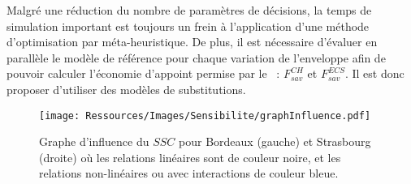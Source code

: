 Malgré une réduction du nombre de paramètres de décisions, la temps de simulation
important est toujours un frein à l’application d’une méthode d’optimisation
par méta-heuristique. De plus, il est nécessaire d’évaluer en parallèle le modèle
de référence pour chaque variation de l’enveloppe afin de pouvoir calculer l’économie
d’appoint permise par le ~: $F_{sav}^{CH}$ et $F_{sav}^{ECS}$. Il est donc
proposer d’utiliser des modèles de substitutions.

\begin{figure}
    \centering
    \texttt{[image: Ressources/Images/Sensibilite/graphInfluence.pdf]}
    \caption[Graphe d’influence du $SSC$ pour Bordeaux et Strasbourg]
            {Graphe d’influence du $SSC$ pour Bordeaux (gauche) et Strasbourg (droite) où les
             relations linéaires sont de couleur noire, et les relations non-linéaires ou
             avec interactions de couleur bleue.}
    \label{fig:graphe_influence_objectifs}
\end{figure}



